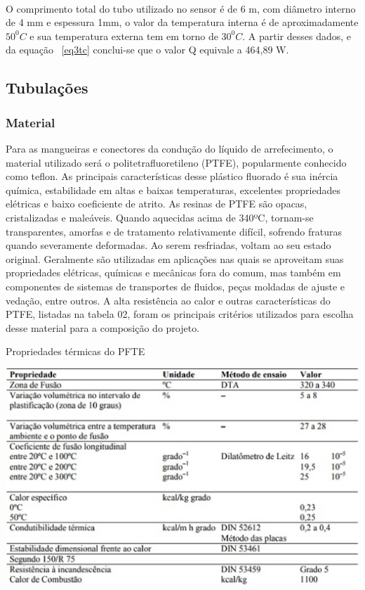 \\O comprimento total do tubo utilizado no sensor é de 6 m, com diâmetro interno de 4 mm e espessura 1mm, o valor da temperatura interna é de aproximadamente $50^0C$ e sua temperatura externa tem em torno de $30^0C$. A partir desses dados, e da equação ~\ref{eq3tc} conclui-se que o valor Q equivale a 464,89 W.
\subsection{Tubulações}
\subsubsection{Material}
Para as mangueiras e conectores da condução do líquido de arrefecimento, o material utilizado será o politetrafluoretileno (PTFE), popularmente conhecido como teflon. As principais características desse plástico fluorado é sua inércia química, estabilidade em altas e baixas temperaturas, excelentes propriedades elétricas e baixo coeficiente de atrito. 
As resinas de PTFE são opacas, cristalizadas e maleáveis. Quando aquecidas acima de 340ºC, tornam-se transparentes, amorfas e de tratamento relativamente difícil, sofrendo fraturas quando severamente deformadas. Ao serem resfriadas, voltam ao seu estado original. 
Geralmente são utilizadas em aplicações nas quais se aproveitam suas propriedades elétricas, químicas e mecânicas fora do comum, mas também em componentes de sistemas de transportes de fluidos, peças moldadas de ajuste e vedação, entre outros. 
A alta resistência ao calor e outras características do PTFE, listadas na tabela 02, foram os principais critérios utilizados para escolha desse material para a composição do projeto. 
\begin{table}[!htb]
	\centering
	\caption{Propriedades térmicas do PFTE}\label{tab2tc}
	\includegraphics[scale=0.8]{figuras/Figura5tc.eps}
\end{table}
